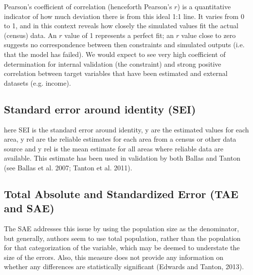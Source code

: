 \documentclass[a4paper,10pt]{article}
\begin{document}
Pearson's coefficient of correlation (henceforth Pearson's $r$) is a quantitative
indicator of how much deviation there is from this ideal 1:1 line. It varies from 0 to 1,
and in this context reveals how closely the simulated values fit the actual (census) data.
An $r$ value of 1 represents a perfect fit; an $r$ value close to zero suggests no correspondence
between then constraints and simulated outputs (i.e. that the model has failed).
We would expect to see very high coefficient of determination for
internal validation (the constraint) and strong
positive correlation between target variables that have been estimated and
external datasets (e.g. income).


\subsection{Standard error around identity (SEI)}
here SEI is the standard error around identity, y are the estimated values for
each area, y rel are the reliable estimates for each area from a census or other
data source and y rel is the mean estimate for all areas where reliable data are available.
This estimate has been used in validation by both Ballas and Tanton (see Ballas et al. 2007; Tanton et al. 2011).

\subsection{Total Absolute and Standardized Error (TAE and SAE)}
The SAE addresses this issue by using the population size as the denominator,
 but generally, authors seem to use total population, rather than the population
for that categorization of the variable, which may be deemed to understate the size
of the errors. Also, this measure does not provide any information on whether any
 differences are statistically significant (Edwards and Tanton, 2013).
\end{document}
